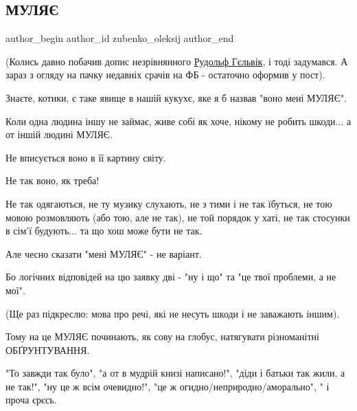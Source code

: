 
 
 
 
 

\subsection{МУЛЯЄ}
\label{sec:09_12_2022.fb.zubenko_oleksij.1.mulya_}

\ifcmt
 author_begin
   author_id zubenko_oleksij
 author_end
\fi

(Колись давно побачив допис незрівнянного
\href{https://www.facebook.com/profile.php?id=100001734192803}{Рудольф
Гєльвік}, і тоді задумався. А зараз з огляду на пачку недавніх срачів на ФБ -
остаточно оформив у пост).

Знаєте, котики, є таке явище в нашій кукухє, яке я б назвав "воно мені МУЛЯЄ".

Коли одна людина іншу не займає, живе собі як хоче, нікому не робить шкоди... а
от іншій людині МУЛЯЄ. 

Не вписується воно в її картину світу.

Не так воно, як треба!

Не так одягаються, не ту музику слухають, не з тими і не так їбуться, не тою
мовою розмовляють (або тою, але не так), не той порядок у хаті, не так стосунки
в сім'ї будують... та що хош може бути не так.

Але чесно сказати "мені МУЛЯЄ" - не варіант.

Бо логічних відповідей на цю заявку дві - "ну і що" та "це твої проблеми, а не
мої".

(Ще раз підкреслю: мова про речі, які не несуть шкоди і не заважають іншим).

Тому на це МУЛЯЄ починають, як сову на глобус, натягувати різноманітні
ОБҐРУНТУВАННЯ.

"То завжди так було", "а от в мудрій книзі  написано!", "діди і батьки так
жили, а не так!", "ну це ж всім очевидно!", "це ж огидно/неприродно/аморально",
" і проча єрєсь.

